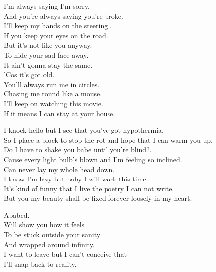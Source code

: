 


I'm always saying I'm sorry. \\
And you're always saying you're broke. \\
I'll keep my hands on the steering . \\
If you keep your eyes on the road. \\
But it's not like you anyway. \\
To hide your sad face away. \\
It ain't gonna stay the same. \\
'Cos it's got old. \\

You'll always run me in circles. \\
Chasing me round like a mouse. \\
I'll keep on watching this movie. \\
If it means I can stay at your house. \\




I knock hello but I see that you've got hypothermia. \\
So I place a block to stop the rot and hope that I can warm you up. \\
Do I have to shake you babe until you're blind?. \\
Cause every light bulb's blown and I'm feeling so inclined. \\
Can never lay my whole head down. \\

I know I'm lazy but baby I will work this time. \\
It's kind of funny that I live the poetry I can not write. \\
But you my beauty shall be fixed forever loosely in my heart. \\




Ababcd. \\
Will show you how it feels \\
To be stuck outside your sanity \\
And wrapped around infinity. \\
I want to leave but I can't conceive that \\
I'll snap back to reality. \\

